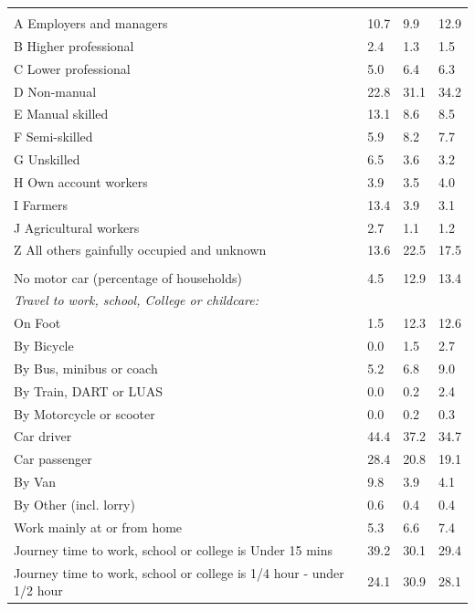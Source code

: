 \documentclass{article}
\begin{document}
\begin{table}[h]
\begin{tabular}{KTTT}
\hline
    \\ 
    \hline
A Employers and managers & 10.7&  9.9& 12.9\\
B Higher professional & 2.4& 1.3& 1.5\\
C Lower professional & 5.0& 6.4& 6.3\\
D Non-manual & 22.8& 31.1& 34.2\\
E Manual skilled & 13.1&  8.6&  8.5\\
F Semi-skilled & 5.9& 8.2& 7.7\\
G Unskilled & 6.5& 3.6& 3.2\\
H Own account workers & 3.9& 3.5& 4.0\\
I Farmers & 13.4&  3.9&  3.1\\
J Agricultural workers & 2.7& 1.1& 1.2\\
Z All others gainfully occupied and unknown & 13.6& 22.5& 17.5\\
\hline
{}\hline
    \\ 
    \hline
No motor car (percentage of households) &  4.5& 12.9& 
13.4\\
    \hline
\emph{Travel to work, school, College or childcare:} & & & \\
\quad On Foot &  1.5& 12.3& 12.6\\
\quad By Bicycle & 0.0& 1.5& 2.7\\
\quad By Bus, minibus or coach & 5.2& 6.8& 9.0\\
\quad By Train, DART or LUAS & 0.0& 0.2& 2.4\\
\quad By Motorcycle or scooter & 0.0& 0.2& 0.3\\
\quad Car driver & 44.4& 37.2& 34.7\\
\quad Car passenger & 28.4& 20.8& 19.1\\
\quad By Van & 9.8& 3.9& 4.1\\
\quad By Other (incl. lorry) & 0.6& 0.4& 0.4\\
    \hline
Work mainly at or from home & 5.3& 6.6& 7.4\\
Journey time to work, school or college is Under 15 mins & 39.2& 30.1& 29.4\\
Journey time to work, school or college is 1/4 hour - under 1/2 hour & 24.1& 30.9& 28.1\\

\end{tabular}
\end{table}
\end{document}
